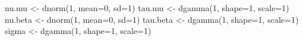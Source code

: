 \documentclass[
]{article}
\newenvironment{Shaded}{\begin{snugshade}}{\end{snugshade}}
\newcommand{\AttributeTok}[1]{\textcolor[rgb]{0.77,0.63,0.00}{#1}}
\newcommand{\DecValTok}[1]{\textcolor[rgb]{0.00,0.00,0.81}{#1}}
\newcommand{\FunctionTok}[1]{\textcolor[rgb]{0.00,0.00,0.00}{#1}}
\newcommand{\NormalTok}[1]{#1}
\newcommand{\OtherTok}[1]{\textcolor[rgb]{0.56,0.35,0.01}{#1}}
\begin{document}
\begin{Shaded}
\begin{Highlighting}[]
\NormalTok{nu.mu }\OtherTok{\textless{}{-}} \FunctionTok{dnorm}\NormalTok{(}\DecValTok{1}\NormalTok{, }\AttributeTok{mean=}\DecValTok{0}\NormalTok{, }\AttributeTok{sd=}\DecValTok{1}\NormalTok{)}
\NormalTok{tau.mu }\OtherTok{\textless{}{-}} \FunctionTok{dgamma}\NormalTok{(}\DecValTok{1}\NormalTok{, }\AttributeTok{shape=}\DecValTok{1}\NormalTok{, }\AttributeTok{scale=}\DecValTok{1}\NormalTok{)}
\NormalTok{nu.beta }\OtherTok{\textless{}{-}} \FunctionTok{dnorm}\NormalTok{(}\DecValTok{1}\NormalTok{, }\AttributeTok{mean=}\DecValTok{0}\NormalTok{, }\AttributeTok{sd=}\DecValTok{1}\NormalTok{)}
\NormalTok{tau.beta }\OtherTok{\textless{}{-}} \FunctionTok{dgamma}\NormalTok{(}\DecValTok{1}\NormalTok{, }\AttributeTok{shape=}\DecValTok{1}\NormalTok{, }\AttributeTok{scale=}\DecValTok{1}\NormalTok{)}
\NormalTok{sigma }\OtherTok{\textless{}{-}} \FunctionTok{dgamma}\NormalTok{(}\DecValTok{1}\NormalTok{, }\AttributeTok{shape=}\DecValTok{1}\NormalTok{, }\AttributeTok{scale=}\DecValTok{1}\NormalTok{)}


\end{Highlighting}
\end{Shaded}
\end{document}
